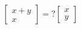 \documentclass[preview]{standalone}
\begin{document}
\begin{align*}
\begin{bmatrix} x + y \\ x \end{bmatrix} = ?\begin{bmatrix} x \\ y \end{bmatrix}
\end{align*}
\end{document}
